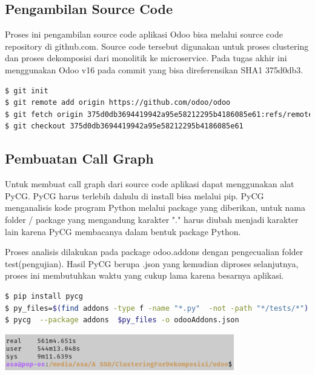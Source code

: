 \subsection{Pengambilan Source Code}
Proses ini pengambilan source code aplikasi Odoo bisa melalui source code repository di github.com. Source code tersebut digunakan untuk proses clustering dan proses dekomposisi dari monolitik ke microservice. Pada tugas akhir ini menggunakan Odoo v16 pada commit yang bisa direferensikan SHA1 375d0db3. 
\begin{lstlisting}[style=mystyle, language=sh, caption={Shell Script Git untuk pengambilan source code}]
$ git init
$ git remote add origin https://github.com/odoo/odoo
$ git fetch origin 375d0db3694419942a95e58212295b4186085e61:refs/remotes/origin/16.0 --depth=1
$ git checkout 375d0db3694419942a95e58212295b4186085e61
\end{lstlisting} 

\subsection{Pembuatan Call Graph}
Untuk membuat call graph dari source code aplikasi dapat menggunakan alat PyCG. PyCG harus terlebih dahulu di install bisa melalui pip. PyCG menganalisis kode program Python melalui package yang diberikan, untuk nama folder / package yang mengandung karakter "." harus diubah menjadi karakter lain karena PyCG membacanya dalam bentuk package Python. 

Proses analisis  dilakukan pada package odoo.addons dengan pengecualian folder test(pengujian). Hasil PyCG berupa .json yang kemudian diproses selanjutnya, proses ini membutuhkan waktu yang cukup lama karena besarnya aplikasi.
\begin{lstlisting}[style=mystyle, language=sh, caption={Shell Script untuk pembuatan call graph}]
$ pip install pycg
$ py_files=$(find addons -type f -name "*.py"  -not -path "*/tests/*")
$ pycg  --package addons  $py_files -o odooAddons.json
\end{lstlisting}

\begin{center}
	\includegraphics[width=10cm]{img/bab_4/hasil_run_pycg.png}
	\label{fig:hasil_run_pycg}
\end{center}

